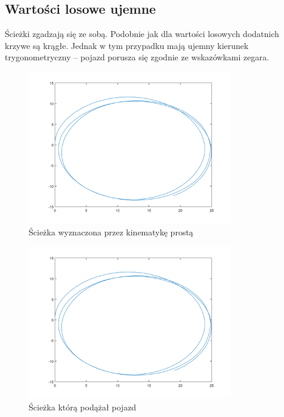 \documentclass[a4paper, 12pt]{report}
\begin{document}
			\subsection{Wartości losowe ujemne}
				Ścieżki zgadzają się ze sobą. Podobnie jak dla wartości losowych dodatnich krzywe są krągłe. Jednak w tym przypadku mają ujemny kierunek trygonometryczny -- pojazd porusza się zgodnie ze wskazówkami zegara.
				\begin{figure}[H]
					\centering
					\includegraphics[width = 0.8\textwidth]{./AP/img/random_left_in_1.png}
					\caption{Ścieżka wyznaczona przez kinematykę prostą}
				\end{figure}
				\begin{figure}[H]
					\centering
					\includegraphics[width = 0.8\textwidth]{./AP/img/random_left_in_2.png}
					\caption{Ścieżka którą podążał pojazd}
				\end{figure}
\end{document}
